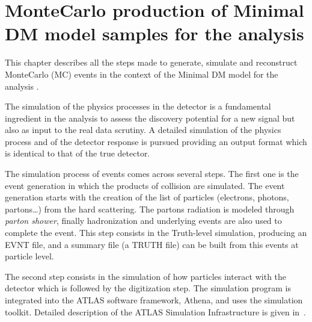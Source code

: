 \chapter[MonteCarlo samples production]{MonteCarlo production of Minimal DM model samples for the \mph analysis}

\lettrine{T}{}his chapter describes all the steps made to generate, simulate and reconstruct MonteCarlo (MC) events in the context of the Minimal DM model for the \mph analysis .


The simulation of the physics processes in the detector is a fundamental ingredient in the analysis to assess the discovery potential for a new signal but also as input to the real data scrutiny.
A detailed simulation  of the physics process and of the detector response is pursued providing an output format which is identical to that of the true detector. 

The simulation process of events comes across several steps. The first one is the event generation in which the products of \pp collision are simulated. The event generation starts with the creation of the list of particles (electrons, photons, partons\dots) from the hard scattering. The partons radiation is modeled through \emph{parton shower}, finally hadronization and underlying events are also used to complete the event. This step consists in the Truth-level simulation, producing an EVNT file, and a summary file (a TRUTH file) can be built from this events at particle level.

The second step consists in the simulation of how particles interact with the detector which is followed by the digitization step. The simulation program is integrated into the ATLAS software framework, Athena, and uses the \geant \cite{geant4} simulation toolkit. Detailed description of the ATLAS Simulation Infrastructure is given in~\cite{simulation}.

